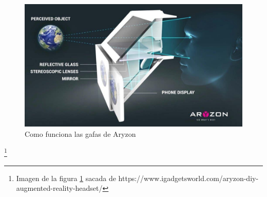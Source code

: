 \begin{figure}[H]
    \centering
    \includegraphics[width=0.75\linewidth]{Images/How-it-works.jpg}
    \caption{Como funciona las gafas de Aryzon}
    \label{GafasAryzon}
\end{figure}
 {\let\thefootnote\relax\footnote{{Imagen de la figura \ref{GafasAryzon} sacada de https://www.igadgetsworld.com/aryzon-diy-augmented-reality-headset/}}}

